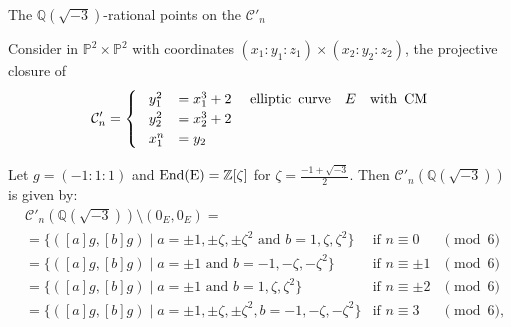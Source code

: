 \documentclass[12pt]{beamer}
\newcommand{\qe}{\mathbb{Q}}
\newcommand{\Ci}{\mathcal{C}}
\begin{document}
 \begin{frame}{ The  $\qe(\sqrt{-3})$-rational points on the  $\Ci'_n$ }
 \begin{example}
Consider in $\mathbb{P}^2\times\mathbb{P}^2$ with coordinates  $(x_1:y_1:z_1)\times (x_2:y_2:z_2)$, the projective closure of
\begin{equation*}
\mathcal{C}'_n=\begin{cases}
\,\,\,\,\,y_1^2&=x_1^3+2\,\,\,\,\,\,\,\,{\rm{elliptic \,\,\, curve}\quad} E \quad {\rm{with \,\,\, CM}}\\
\,\,\,\,\,y_2^2&=x_2^3+2\,\,\,\,\,\,\,\,\\
\,\,\,\,\,x_1^n&=y_2
\end{cases}
\end{equation*}

 \begin{alertblock}{Let $g=(-1:1:1)$ and  $\rm{End}
    (E)=\mathbb{Z}[\zeta]$ for $\zeta=\frac{-1+\sqrt{-3}}{2}$. Then $\Ci'_n(\qe(\sqrt{-3}))$ is given by:} 
     \begin{align*}
	&\Ci'_n(\qe(\sqrt{-3}))\setminus {(0_E,0_E)} = & & \\
	&=\{([a] g, [b] g)\mid a=\pm 1, \pm \zeta, \pm \zeta^2\text{ and }b=1,\zeta,\zeta^2\}	&\text{if }n\equiv 0&\pmod 6\\
	&=\{([a ] g, [b ]g)\mid a=\pm 1\text{ and }b=-1,-\zeta,-\zeta^2\}	&\text{if }n\equiv \pm 1&\pmod 6\\
	&=\{([a ]g, [b] g)\mid a=\pm 1\text{ and }b=1,\zeta,\zeta^2\}	&\text{if }n\equiv \pm 2&\pmod 6\\
	&=\{([a] g, [b] g)\mid a=\pm 1, \pm \zeta, \pm \zeta^2, b=-1,-\zeta,-\zeta^2\}	&\text{if }n\equiv 3&\pmod 6,
     \end{align*}
 \end{alertblock}
 \end{example}
 \end{frame}
\end{document}

